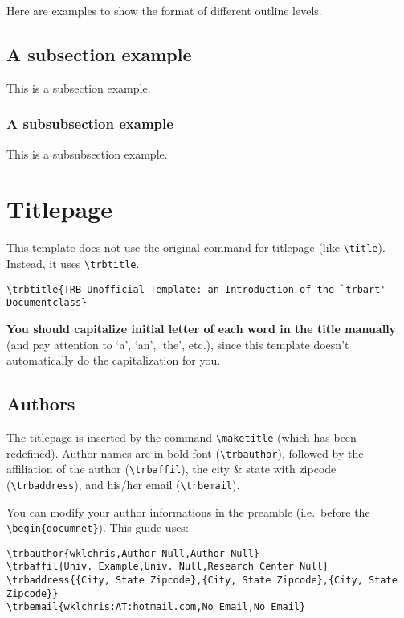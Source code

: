 \documentclass[12pt]{trbart}
\begin{document}
Here are examples to show the format of different outline levels.

\subsection{A subsection example}
This is a subsection example.

\subsubsection{A subsubsection example}
This is a subsubsection example.


\section{Titlepage}
This template does not use the original command for titlepage (like \verb+\title+). Instead, it uses \verb+\trbtitle+. 
\begin{verbatim}
\trbtitle{TRB Unofficial Template: an Introduction of the `trbart' Documentclass}
\end{verbatim}

\textbf{You should capitalize initial letter of each word in the title manually} (and pay attention to `a', `an', `the', etc.), since this template doesn't automatically do the capitalization for you.

\subsection{Authors}
The titlepage is inserted by the command \verb+\maketitle+ (which has been redefined). Author names are in bold font (\verb+\trbauthor+), followed by the affiliation of the author (\verb+\trbaffil+), the city \& state with zipcode (\verb+\trbaddress+), and his/her email (\verb+\trbemail+). 

You can modify your author informations in the preamble (i.e.~before the \verb+\begin{documnet}+). This guide uses:
\begin{verbatim}
\trbauthor{wklchris,Author Null,Author Null}
\trbaffil{Univ. Example,Univ. Null,Research Center Null}
\trbaddress{{City, State Zipcode},{City, State Zipcode},{City, State Zipcode}}
\trbemail{wklchris:AT:hotmail.com,No Email,No Email}
\end{verbatim}
\end{document}
